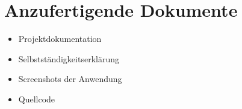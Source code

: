 \section*{Anzufertigende Dokumente}
\begin{itemize}
\item Projektdokumentation
\item Selbstständigkeitserklärung
\item Screenshots der Anwendung
\item Quellcode
\end{itemize}
